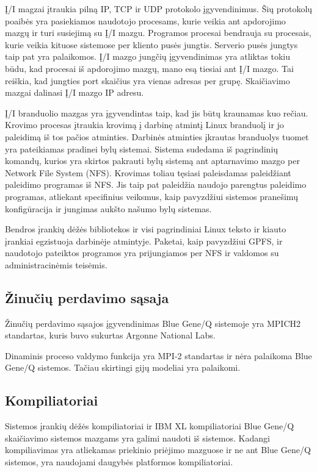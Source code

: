 Į/I magzai įtraukia pilną IP, TCP ir UDP protokolo įgyvendinimus.
Šių protokolų poaibės yra pasiekiamos naudotojo procesams, kurie veikia ant apdorojimo mazgų ir turi susiejimą su Į/I mazgu.
Programos procesai bendrauja su procesais, kurie veikia kituose sistemose per kliento pusės jungtis.
Serverio pusės jungtys taip pat yra palaikomos.
Į/I mazgo jungčių įgyvendinimas yra atliktas tokiu būdu, kad procesai iš apdorojimo mazgų, mano esą tiesiai ant Į/I mazgo.
Tai reiškia, kad jungties port skaičius yra vienas adresas per grupę.
Skaičiavimo mazgai dalinasi Į/I mazgo IP adresu.

Į/I branduolio mazgas yra įgyvendintas taip, kad jis būtų kraunamas kuo rečiau.
Krovimo procesas įtraukia krovimą į darbinę atmintį Linux branduolį ir jo paleidimą iš tos pačios atminties.
Darbinės atminties įkrautas branduolys tuomet yra pateikiamas pradinei bylų sistemai.
Sistema sudedama iš pagrindinių komandų, kurios yra skirtos pakrauti bylų sistemą ant aptarnavimo mazgo per Network File System (NFS).
Krovimas toliau tęsiasi paleisdamas paleidžiant paleidimo programas iš NFS.
Jis taip pat paleidžia naudojo parengtus paleidimo programas, atliekant specifinius veiksmus, kaip pavyzdžiui sistemos pranešimų konfigūracija ir jungimas aukšto našumo bylų sistemas.

Bendros įrankių dėžės bibliotekos ir visi pagrindiniai Linux teksto ir kiauto įrankiai egzistuoja darbinėje atmintyje.
Paketai, kaip pavyzdžiui GPFS, ir naudotojo pateiktos programos yra prijungiamos per NFS ir valdomos su administracinėmis teisėmis.

\subsection{Žinučių perdavimo sąsaja}

Žinučių perdavimo sąsajos įgyvendinimas Blue Gene/Q sistemoje yra MPICH2 standartas, kuris buvo sukurtas Argonne National Labs.

Dinaminis proceso valdymo funkcija yra MPI-2 standartas ir nėra palaikoma Blue Gene/Q sistemos.
Tačiau skirtingi gijų modeliai yra palaikomi.

\subsection{Kompiliatoriai}

Sistemos įrankių dėžės kompiliatoriai ir IBM XL kompiliatoriai Blue Gene/Q skaičiavimo sistemos mazgams yra galimi naudoti iš sistemos.
Kadangi kompiliavimas yra atliekamas priekinio priėjimo mazguose ir ne ant Blue Gene/Q sistemos, yra naudojami daugybės platformos kompiliatoriai.

